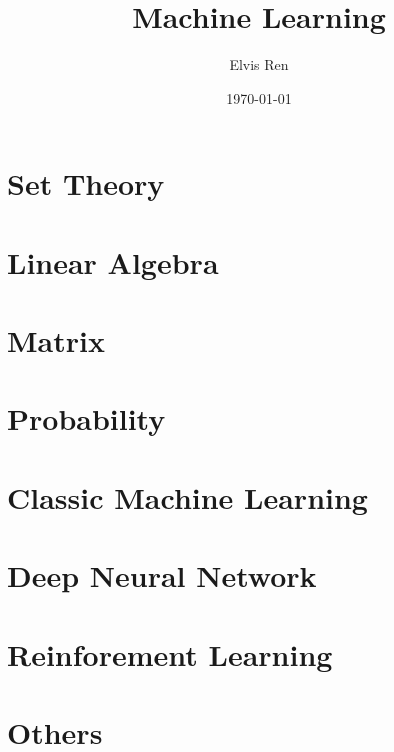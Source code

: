 \documentclass[reqno]{book}
\begin{document}
\title{Machine Learning}
\author{Elvis Ren}
\date{\today}

\maketitle
\tableofcontents



\chapter{Set Theory}





\chapter{Linear Algebra}










\chapter{Matrix}



\chapter{Probability}




\chapter{Classic Machine Learning}



\chapter {Deep Neural Network}




\chapter{Reinforement Learning}



 









\chapter{Others}



{}



\printindex
\end{document}

